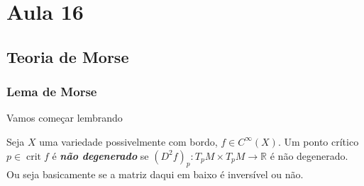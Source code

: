 \section{Aula 16}

\subsection{Teoria de Morse}

\subsubsection{Lema de Morse}

Vamos começar lembrando 

\begin{defn}\leavevmode
Seja \(X\) uma variedade possivelmente com bordo, \(f \in C^\infty (X)\). Um ponto crítico \(p \in \operatorname{crit}f\) é \textit{\textbf{não degenerado}} se \((D^2f)_p:T_pM \times T_pM \to \mathbb{R}\) é não degenerado. Ou seja basicamente se a matriz daqui em baixo é inversível ou não.
\end{defn}

